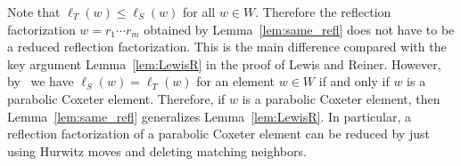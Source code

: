 \begin{rema}
Note that $\ell_T(w) \leq \ell_S(w)$ for all $w \in W$. Therefore the reflection factorization $w = r_1 \cdots r_m$ obtained by Lemma~\ref{lem:same_refl} does not have to be a reduced reflection factorization. This is the main difference compared with the key argument Lemma~\ref{lem:LewisR} in the proof of Lewis and Reiner. However, by~\cite[Lemma~2.1]{BDSW14} we have $\ell_S(w)=\ell_T(w)$ for an element $w \in W$ if and only if $w$ is a parabolic Coxeter element. Therefore, if $w$ is a parabolic Coxeter element, then Lemma~\ref{lem:same_refl} generalizes Lemma~\ref{lem:LewisR}. In particular, a reflection factorization of a parabolic Coxeter element can be reduced by just using Hurwitz moves and deleting matching neighbors.
\end{rema}

